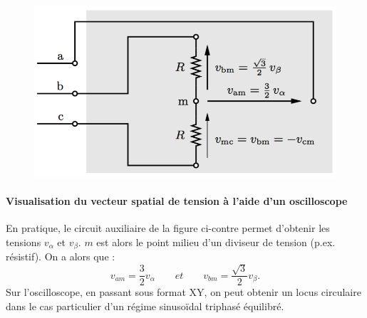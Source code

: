 		\begin{figure}
		\vspace{-5mm}
		\includegraphics[scale=0.3]{ch4/27}
		\end{figure}
		\paragraph{Visualisation du vecteur spatial de tension à l'aide d'un oscilloscope} \quad En pratique, le circuit auxiliaire de la figure ci-contre permet d'obtenir les tensions $v_\alpha$ et $v_\beta$. $m$ est alors le point milieu d'un diviseur de tension (p.ex. résistif). On a alors que : 
		\begin{equation}
			v_{am} = \frac{3}{2}v_\alpha \qquad et \qquad v_{bm} = \frac{\sqrt{3}}{2}v_\beta . 
		\end{equation}
		Sur l'oscilloscope, en passant sous format XY, on peut obtenir un locus circulaire dans le cas particulier d'un régime sinusoïdal triphasé équilibré.
		
